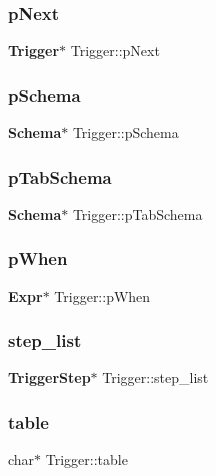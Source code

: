 \subsubsection{pNext}
{\footnotesize\ttfamily \textbf{ Trigger}$\ast$ Trigger\+::p\+Next}

\mbox{\label{struct_trigger_a83edbfa91ce6520a6ebc1a21acc2cd5e}} 
\subsubsection{pSchema}
{\footnotesize\ttfamily \textbf{ Schema}$\ast$ Trigger\+::p\+Schema}

\mbox{\label{struct_trigger_a8e4a9b3f4bcc5c645e1777b3bb94a6d8}} 
\subsubsection{pTabSchema}
{\footnotesize\ttfamily \textbf{ Schema}$\ast$ Trigger\+::p\+Tab\+Schema}

\mbox{\label{struct_trigger_a1b6cdd46e8b98562920d1acee86281ed}} 
\subsubsection{pWhen}
{\footnotesize\ttfamily \textbf{ Expr}$\ast$ Trigger\+::p\+When}

\mbox{\label{struct_trigger_a4206faaae6cdf1a2b22a2c9f15c88642}} 
\subsubsection{step\_list}
{\footnotesize\ttfamily \textbf{ Trigger\+Step}$\ast$ Trigger\+::step\+\_\+list}

\mbox{\label{struct_trigger_ab9d5500f7fc43382e867733a2968ecae}} 
\subsubsection{table}
{\footnotesize\ttfamily char$\ast$ Trigger\+::table}

\mbox{\label{struct_trigger_af0d10da140b068bfd76aaeb6607fa6cf}} 
